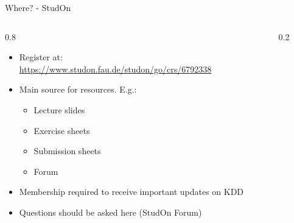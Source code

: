 \begin{frame}{Where? - StudOn}
	\begin{columns}
		\begin{column}{0.8\textwidth}
			\begin{itemize}
				\item Register at: \\ \url{https://www.studon.fau.de/studon/go/crs/6792338}
				\item Main source for resources. E.g.:
				      \begin{itemize}
					      \item Lecture slides
					      \item Exercise sheets
					      \item Submission sheets
					      \item Forum
				      \end{itemize}
				\item Membership required to receive important updates on KDD
				\item Questions should be asked here (StudOn Forum)

			\end{itemize}
		\end{column}
		\begin{column}{0.2\textwidth}
			\begin{center}
			\end{center}
		\end{column}
	\end{columns}

\end{frame}


